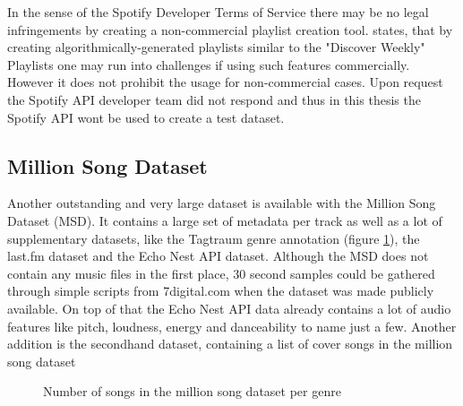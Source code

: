 In the sense of the Spotify Developer Terms of Service \cite{spottac2} there may be no legal infringements by creating a non-commercial playlist creation tool. \cite{spottac3} states, that by creating algorithmically-generated playlists similar to the "Discover Weekly" Playlists one may run into challenges if using such features commercially. 
However it does not prohibit the usage for non-commercial cases.  
Upon request the Spotify API developer team did not respond and thus in this thesis the Spotify API wont be used to create a test dataset.

\subsection{Million Song Dataset}

Another outstanding and very large dataset is available with the Million Song Dataset (MSD)\cite{msd1}. 
It contains a large set of metadata per track as well as a lot of supplementary datasets, like the Tagtraum genre annotation (figure \ref{msddist})\cite{msd5}, the last.fm dataset\cite{msd2} and the Echo Nest API dataset\cite{msd3}. Although the MSD does not contain any music files in the first place, 30 second samples could be gathered through simple scripts from 7digital.com when the dataset was made publicly available. On top of that the Echo Nest API data already contains a lot of audio features like pitch, loudness, energy and danceability to name just a few.
Another addition is the secondhand dataset, containing a list of cover songs in the million song dataset\cite{msd6}
\begin{figure}[thpb]
	\centering
	\caption{Number of songs in the million song dataset per genre}
	\label{msddist}
\end{figure}
